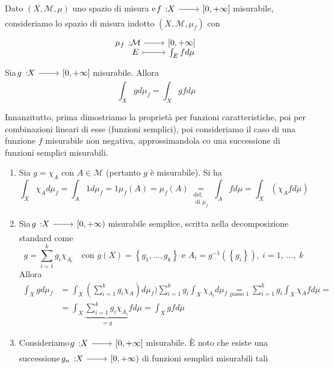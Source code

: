 \begin{theorema}
	Dato $\left(X,\mathcal{M},\mu\right)$ uno spazio di misura e $\funz{f}{X}{\left[0,+\infty\right]}$ misurabile, consideriamo lo spazio di misura indotto $\left(X,\mathcal{M},\mu_f\right)$ con
	\begin{equation*}
		\funztot{\mu_f}{\mathcal{M}}{\left[0,+\infty\right]}{E}{\int_Efd\mu}
	\end{equation*}
	Sia $\funz{g}{X}{\left[0,+\infty\right]}$ misurabile. Allora
	\begin{equation}
		\int_Xgd\mu_f=\int_Xgfd\mu
	\end{equation}
\end{theorema}
\begin{demonstration}
	Innanzitutto, prima dimostriamo la proprietà per funzioni caratteristiche, poi per combinazioni lineari di esse (funzioni semplici), poi consideriamo il caso di una funzione $f$ misurabile non negativa, approssimandola co una successione di funzioni semplici misurabili.\\
	\begin{enumerate}[label=\Roman*]
		\item Sia $g=\chi_A$ con $A\in\mathcal{M}$ (pertanto $g$ è misurabile). Si ha
		\begin{equation*}
			\int_X\chi_Ad\mu_f=\int_A 1d\mu_f=1\mu_f\left(A\right)=\mu_f\left(A\right)\underset{\substack{\text{def.}\\\text{ di }\mu_f}}{=}\int_Afd\mu=\int_X\left(\chi_Afd\mu\right)
		\end{equation*}
		\item Sia $\funz{g}{X}{\left[0,+\infty\right)}$ misurabile semplice, scritta nella decomposizione standard come
		\begin{equation*}
			g=\sum_{i=1}^kg_i\chi_{A_i}\quad\text{con }g\left(X\right)=\left\{g_1,\ldots,g_k\right\}\text{ e }A_i=g^{-1}\left(\left\{g_i\right\}\right),\ i=1,\ \ldots,\ k
		\end{equation*}
	Allora
	\begin{align*}
			\int_Xgd\mu_f&=\int_X\left(\sum_{i=1}^kg_i\chi_A\right)d\mu_f)\sum_{i=1}^{k}g_i\int_X\chi_{A_i}d\mu_f\underset{\text{passo }1}{=}\sum_{i=1}^{k}g_i\int_X\chi_Afd\mu=\\
			&=\int_X\underbrace{\sum_{i=1}^{k}g_i\chi_{A_i}}_{=g}fd\mu=\int_Xgfd\mu
	\end{align*}
	\item Consideriamo $\funz{g}{X}{\left[0,+\infty\right]}$ misurabile. È noto che esiste una successione $\funz{g_n}{X}{\left[0,+\infty\right)}$ di funzioni semplici misurabili tali

\end{enumerate}
\end{demonstration}
